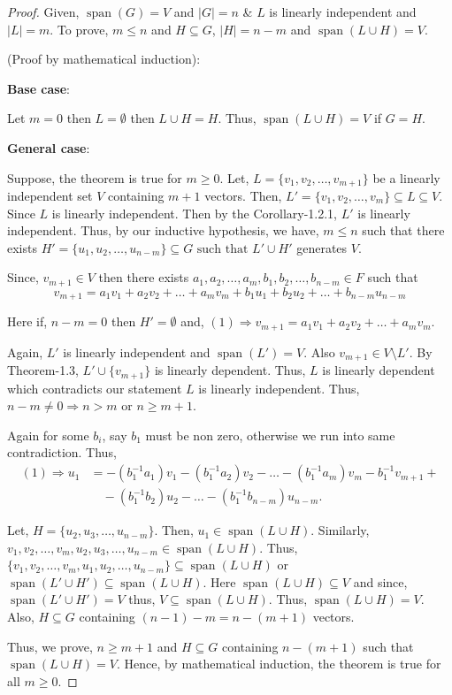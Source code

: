 \documentclass[12pt, a4paper]{article}
\theoremstyle{definition}
\theoremstyle{remark}
\newcommand{\st}{\text{ such that }}
\DeclareMathOperator{\Span}{span}
\begin{document}
\begin{proof}
    Given, $\Span(G) = V$ and $|G| = n$ \& $L$ is linearly independent and $|L| = m$.
To prove, $m \leq n$ and $H \subseteq G$, $|H| = n-m$ and $\Span(L \cup H) = V$.

\noindent (Proof by mathematical induction):

\noindent \textbf{Base case}:

Let $m=0$ then $L = \emptyset$ then $L \cup H = H$. Thus, $\Span(L \cup H) = V$ if $G = H$.

\noindent \textbf{General case}:

Suppose, the theorem is true for $m \geq 0$. Let, $L = \{v_1, v_2, \dots, v_{m+1}\}$ be a linearly independent set $V$ containing $m+1$ vectors. Then, $L' = \{v_1, v_2, \dots, v_m\} \subseteq L \subseteq V$. Since $L$ is linearly independent. Then by the Corollary-1.2.1, $L'$ is linearly independent. Thus, by our inductive hypothesis, we have,
$m \leq n$ such that there exists $H' = \{u_1, u_2, \dots, u_{n-m}\} \subseteq G \st L' \cup H'$ generates $V$.

Since, $v_{m+1} \in V$ then there exists $a_1, a_2, \dots, a_m, b_1, b_2, \dots, b_{n-m} \in F$ such that
\[
    v_{m+1} = a_1 v_1 + a_2 v_2 + \dots + a_m v_m + b_1 u_1 + b_2 u_2 + \dots + b_{n-m} u_{n-m} \tag{1}
\]

Here if, $n-m = 0$ then $H' = \emptyset$ and, $(1) \Rightarrow v_{m+1} = a_1 v_1 + a_2 v_2 + \dots + a_m v_m$.

Again, $L'$ is linearly independent and $\Span(L') = V$. Also $v_{m+1} \in V \setminus L'$.
By Theorem-1.3, $L' \cup \{v_{m+1}\}$ is linearly dependent. Thus, $L$ is linearly dependent which contradicts our statement $L$ is linearly independent. Thus, $n-m \neq 0 \Rightarrow n > m$ or $n \geq m+1$.

Again for some $b_i$, say $b_1$ must be non zero, otherwise we run into same contradiction. Thus,
\begin{align*}
    (1) \Rightarrow u_1 &= -(b_1^{-1} a_1) v_1 - (b_1^{-1} a_2) v_2 - \dots - (b_1^{-1} a_m) v_m - b_1^{-1} v_{m+1} +\\
    & \quad -(b_1^{-1} b_2) u_2 - \dots - (b_1^{-1} b_{n-m}) u_{n-m}.
\end{align*}

Let, $H = \{u_2, u_3, \dots, u_{n-m}\}$. Then, $u_1 \in \Span(L \cup H)$. Similarly,
$v_1, v_2, \dots, v_m, u_2, u_3, \dots, u_{n-m} \in \Span(L \cup H)$. Thus,
$\{v_1, v_2, \dots, v_m, u_1, u_2, \dots, u_{n-m}\} \subseteq \Span(L \cup H)$
or $\Span(L' \cup H') \subseteq \Span(L \cup H)$. Here $\Span(L \cup H) \subseteq V$ and since, $\Span(L' \cup H') = V$ thus, $V \subseteq \Span(L \cup H)$. Thus, $\Span(L \cup H) = V$. Also, $H \subseteq G$ containing $(n-1) - m = n - (m+1)$ vectors.

Thus, we prove, $n \geq m+1$ and $H \subseteq G$ containing $n-(m+1)$ such that $\Span(L \cup H) = V$. Hence, by mathematical induction, the theorem is true for all $m \geq 0$.
\end{proof}
\end{document}
